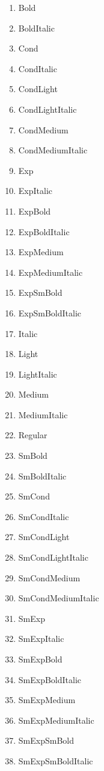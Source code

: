 \documentclass{article}
\begin{document}
\begin{enumerate}
\item {\jBold Bold}
\item {\jBoldItalic BoldItalic}
\item {\jCond Cond}
\item {\jCondItalic CondItalic}
\item {\jCondLight CondLight}
\item {\jCondLightItalic CondLightItalic}
\item {\jCondMedium CondMedium}
\item {\jCondMediumItalic CondMediumItalic}
\item {\jExp Exp}
\item {\jExpItalic ExpItalic}
\item {\jExpBold ExpBold}
\item {\jExpBoldItalic ExpBoldItalic}
\item {\jExpMedium ExpMedium}
\item {\jExpMediumItalic ExpMediumItalic}
\item {\jExpSmBold ExpSmBold}
\item {\jExpSmBoldItalic ExpSmBoldItalic}
\item {\jItalic Italic}
\item {\jLight Light}
\item {\jLightItalic LightItalic}
\item {\jMedium Medium}
\item {\jMediumItalic MediumItalic}
\item {\jRegular Regular}
\item {\jSmBold SmBold}
\item {\jSmBoldItalic SmBoldItalic}
\item {\jSmCond SmCond}
\item {\jSmCondItalic SmCondItalic}
\item {\jSmCondLight SmCondLight}
\item {\jSmCondLightItalic SmCondLightItalic}
\item {\jSmCondMedium SmCondMedium}
\item {\jSmCondMediumItalic SmCondMediumItalic}
\item {\jSmExp SmExp}
\item {\jSmExpItalic SmExpItalic}
\item {\jSmExpBold SmExpBold}
\item {\jSmExpBoldItalic SmExpBoldItalic}
\item {\jSmExpMedium SmExpMedium}
\item {\jSmExpMediumItalic SmExpMediumItalic}
\item {\jSmExpSmBold SmExpSmBold}
\item {\jSmExpSmBoldItalic SmExpSmBoldItalic}
\end{enumerate}
\end{document}
